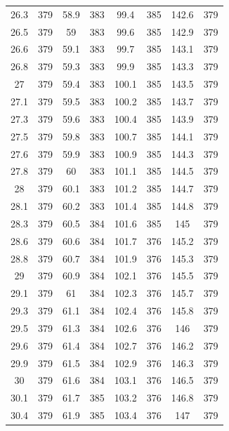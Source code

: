 \documentclass[12pt]{ctexart}
\numberwithin{equation}{section}
\begin{document}
\begin{longtable}{cc|cc|cc|cc}
26.3  &  379  &  58.9  &  383  &  99.4  &  385  &  142.6  &  379  \\
26.5  &  379  &  59  &  383  &  99.6  &  385  &  142.9  &  379  \\
26.6  &  379  &  59.1  &  383  &  99.7  &  385  &  143.1  &  379  \\
26.8  &  379  &  59.3  &  383  &  99.9  &  385  &  143.3  &  379  \\
27  &  379  &  59.4  &  383  &  100.1  &  385  &  143.5  &  379  \\
27.1  &  379  &  59.5  &  383  &  100.2  &  385  &  143.7  &  379  \\
27.3  &  379  &  59.6  &  383  &  100.4  &  385  &  143.9  &  379  \\
27.5  &  379  &  59.8  &  383  &  100.7  &  385  &  144.1  &  379  \\
27.6  &  379  &  59.9  &  383  &  100.9  &  385  &  144.3  &  379  \\
27.8  &  379  &  60  &  383  &  101.1  &  385  &  144.5  &  379  \\
28  &  379  &  60.1  &  383  &  101.2  &  385  &  144.7  &  379  \\
28.1  &  379  &  60.2  &  383  &  101.4  &  385  &  144.8  &  379  \\
28.3  &  379  &  60.5  &  384  &  101.6  &  385  &  145  &  379  \\
28.6  &  379  &  60.6  &  384  &  101.7  &  376  &  145.2  &  379  \\
28.8  &  379  &  60.7  &  384  &  101.9  &  376  &  145.3  &  379  \\
29  &  379  &  60.9  &  384  &  102.1  &  376  &  145.5  &  379  \\
29.1  &  379  &  61  &  384  &  102.3  &  376  &  145.7  &  379  \\
29.3  &  379  &  61.1  &  384  &  102.4  &  376  &  145.8  &  379  \\
29.5  &  379  &  61.3  &  384  &  102.6  &  376  &  146  &  379  \\
29.6  &  379  &  61.4  &  384  &  102.7  &  376  &  146.2  &  379  \\
29.9  &  379  &  61.5  &  384  &  102.9  &  376  &  146.3  &  379  \\
30  &  379  &  61.6  &  384  &  103.1  &  376  &  146.5  &  379  \\
30.1  &  379  &  61.7  &  385  &  103.2  &  376  &  146.8  &  379  \\
30.4  &  379  &  61.9  &  385  &  103.4  &  376  &  147  &  379  \\

\end{longtable}
\end{document}
